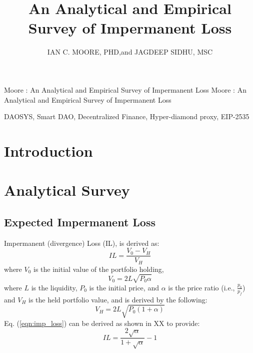 \documentclass[journal,twocolumn,12pt]{ieeesyscoin}
\begin{document}
\history{}

\title{\centering An Analytical and Empirical Survey of Impermanent Loss}
\author{\centering \uppercase{Ian C. Moore, PhD},and
\uppercase{Jagdeep Sidhu, MSc}}

\address[1]{\centering  Syscoin Researcher, Syscoin Platform (e-mail: imoore@syscoin.org)}
\address[2]{\centering Syscoin Lead Developer, (e-mail: sidhujag@syscoin.org)}
\tfootnote{}

\markboth
{Moore \headeretal: An Analytical and Empirical Survey of Impermanent Loss}
{Moore \headeretal: An Analytical and Empirical Survey of Impermanent Loss}

\corresp{}

\begin{abstract}
\lipsum[1]
\end{abstract}

\begin{keywords}
DAOSYS, Smart DAO, Decentralized Finance, Hyper-diamond proxy, EIP-2535
\end{keywords}

\titlepgskip=-15pt

\maketitle

\section{Introduction}
\label{sec:introduction}

\lipsum[1]


\section{Analytical Survey}

\subsection{Expected Impermanent Loss}
\label{sec:exp_impermanent_loss}



Impermanent (divergence) Loss  (IL), is derived as:
\begin{equation}\label{eqn:imp_loss}
IL = \frac{V_{0} - V_{H}}{V_{H}} 
\end{equation}
where $V_{0}$ is the initial value of the portfolio holding,
\begin{equation}\label{eqn:initial_lp_value}
V_{0} = 2L\sqrt{P_{0}\alpha}
\end{equation}
where $L$ is the liquidity, $P_{0}$ is the initial price, and $\alpha$ is the price ratio (i.e., $\frac{p_{0}}{p_{f}}$) 
and $V_{H}$ is the held portfolio value, and is derived by the following:
\begin{equation}\label{eqn:held_lp_value}
V_{H} = 2L\sqrt{P_{0} (1+\alpha)}
\end{equation}
Eq. (\ref{eqn:imp_loss}) can be derived as shown in XX to provide:
\begin{equation}\label{eqn:imp_loss_derv}
IL = \frac{2\sqrt{\alpha}}{1+\sqrt{\alpha}} - 1
\end{equation}
\end{document}

